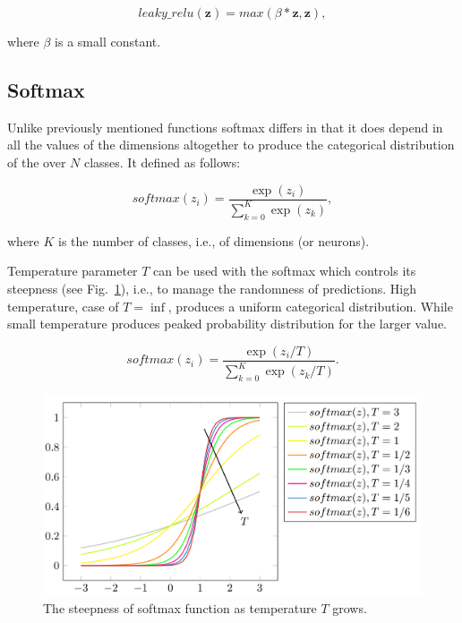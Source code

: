 \begin{equation}\label{eq:lrelu}
    leaky\_relu(\mathbf{z}) = max(\beta*\mathbf{z}, \mathbf{z}),
\end{equation}

\noindent where $\beta$ is a small constant.

\subsection{Softmax}\label{sec:softmax}
 Unlike previously mentioned functions softmax differs in that it does depend in all the values of the  dimensions altogether to produce the categorical distribution of the over $N$ classes. It defined as follows:

\begin{equation}\label{eq:softmax}
    softmax(z_i) = \frac{\exp(z_i)}{\sum_{k=0}^K{\exp(z_k)}},
\end{equation}

\noindent where $K$ is the number of classes, i.e., of dimensions (or neurons).

Temperature parameter $T$ can be used with the softmax which controls its steepness (see Fig.~\ref{fig:softmax}), i.e., to manage the randomness of predictions. High temperature, case of $T = \inf$, produces a uniform categorical distribution. While small temperature produces peaked probability distribution for the larger value.


\begin{equation}\label{eq:softmax_tmp}
    softmax(z_i) = \frac{\exp(z_i / T)}
    {\sum_{k=0}^K{\exp(z_k / T)}}.
\end{equation}

\begin{figure}[t]
    \centering
    \includegraphics[width=\textwidth]{Figures/Softmaxbehaviour.png}
    \caption{The steepness of softmax function as temperature $T$ grows.}\label{fig:softmax}
\end{figure}

